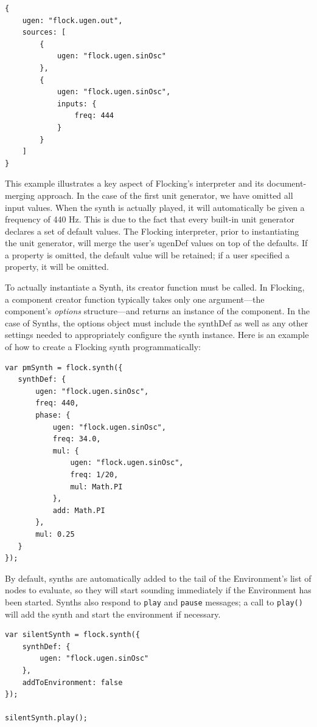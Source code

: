 \documentclass{article}
\begin{document}
\begin{verbatim}
{
    ugen: "flock.ugen.out",
    sources: [
        {
            ugen: "flock.ugen.sinOsc"
        },
        {
            ugen: "flock.ugen.sinOsc",
            inputs: {
                freq: 444
            }
        }
    ]
}
\end{verbatim}

This example illustrates a key aspect of Flocking's interpreter and its document-merging approach. In the case of the first unit generator, we have omitted all input values. When the synth is actually played, it will automatically be given a frequency of 440 Hz. This is due to the fact that every built-in unit generator declares a set of default values. The Flocking interpreter, prior to instantiating the unit generator, will merge the user's ugenDef values on top of the defaults. If a property is omitted, the default value will be retained; if a user specified a property, it will be omitted.

To actually instantiate a Synth, its creator function must be called. In Flocking, a component creator function typically takes only one argument---the component's {\it options} structure---and returns an instance of the component. In the case of Synths, the options object must include the synthDef as well as any other settings needed to appropriately configure the synth instance. Here is an example of how to create a Flocking synth programmatically:

\begin{verbatim}
var pmSynth = flock.synth({
   synthDef: {
       ugen: "flock.ugen.sinOsc",
       freq: 440,
       phase: {
           ugen: "flock.ugen.sinOsc",
           freq: 34.0,
           mul: {
               ugen: "flock.ugen.sinOsc",
               freq: 1/20,
               mul: Math.PI
           },
           add: Math.PI
       },
       mul: 0.25
   }
});
\end{verbatim}

By default, synths are automatically added to the tail of the Environment's list of nodes to evaluate, so they will start sounding immediately if the Environment has been started. Synths also respond to \verb|play| and \verb|pause| messages; a call to \verb|play()| will add the synth and start the environment if necessary.

\begin{verbatim}
var silentSynth = flock.synth({
    synthDef: {
        ugen: "flock.ugen.sinOsc"
    },
    addToEnvironment: false
});

silentSynth.play();
\end{verbatim}
\end{document}
